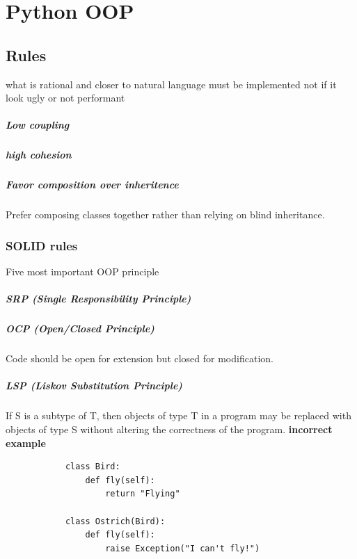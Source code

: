 \chapter{Python OOP}
    
    \section{Rules}
        what is rational and closer to natural language must be implemented not if it look ugly or not performant
        
        \paragraph{Low coupling}
        
        \paragraph{high cohesion}
        
        \paragraph{Favor composition over inheritence}
            Prefer composing classes together rather than relying on blind inheritance.
            

\subsection{SOLID rules}
    Five most important OOP principle
    
    \paragraph{SRP (Single Responsibility Principle)}
    
    \paragraph{OCP (Open/Closed Principle)}
        Code should be open for extension but closed for modification.
    
    \paragraph{LSP (Liskov Substitution Principle)}
        If S is a subtype of T, then objects of type T in a program may be replaced with objects of type S without altering the correctness of the program.
        \textbf{incorrect example}
        \begin{verbatim}
            class Bird:
                def fly(self):
                    return "Flying"

            class Ostrich(Bird):
                def fly(self):
                    raise Exception("I can't fly!")
        \end{verbatim}
        
